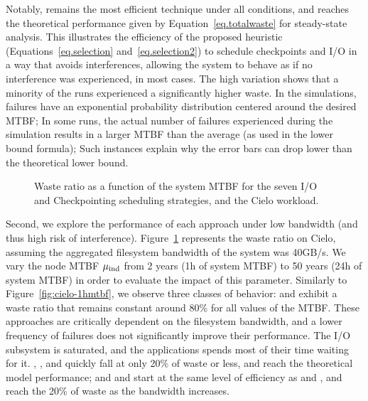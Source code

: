 Notably, \cooperative remains the most efficient technique under all
conditions, and reaches the theoretical performance given by
Equation~\eqref{eq.totalwaste} for steady-state analysis. This
illustrates the efficiency of the proposed heuristic
(Equations~\eqref{eq.selection} and~\eqref{eq.selection2}) to schedule
checkpoints and I/O in a way that avoids interferences, allowing the
system to behave as if no interference was experienced, in most
cases. The high variation shows that a minority of the runs
experienced a significantly higher waste. In the simulations, failures
have an exponential probability distribution centered around the
desired MTBF; In some runs, the actual number of failures experienced
during the simulation results in a larger MTBF than the average (as
used in the lower bound formula); Such instances explain why the error
bars can drop lower than the theoretical lower bound.

\begin{figure}
  \begin{center}
    \resizebox{\linewidth}{!}{}
  \end{center}
  \caption{Waste ratio as a function of the system MTBF for the
    seven I/O and Checkpointing scheduling strategies, and the Cielo
    workload. \label{fig:cielo-40gbs}}
\end{figure}

Second, we explore the performance of each approach under low
bandwidth (and thus high risk of interference).
Figure~\ref{fig:cielo-40gbs} represents the waste ratio on Cielo,
assuming the aggregated filesystem bandwidth of the system was
40GB/s. We vary the node MTBF $\mu_{\text{ind}}$ from 2 years (1h of system
MTBF) to 50 years (24h of system MTBF) in order to evaluate the impact
of this parameter. Similarly to Figure~\ref{fig:cielo-1hmtbf}, we
observe three classes of behavior: \propfixed and \bfifofixed exhibit
a waste ratio that remains constant around 80\% for all values of the
MTBF. These approaches are critically dependent on the filesystem
bandwidth, and a lower frequency of failures does not significantly
improve their performance. The I/O subsystem is saturated, and the
applications spends most of their time waiting for it. \fifodaly,
\fifofixed, and \cooperative quickly fall at only 20\% of waste or
less, and reach the theoretical model performance; and \propdaly and
\bfifodaly start at the same level of efficiency as \propfixed and
\bfifofixed, and reach the 20\% of waste as the bandwidth increases.

